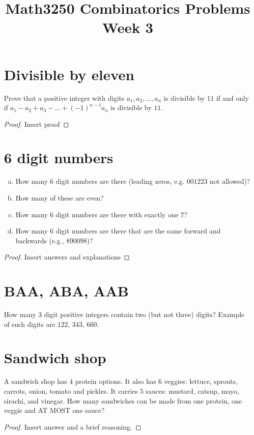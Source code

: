 \documentclass[12pt]{amsart}
\title{Math3250 Combinatorics Problems Week 3}
\date{}
\begin{document}
\maketitle





\section{Divisible by eleven}
Prove that a positive integer with digits $a_1, a_2, \dots, a_n$ is divisible by $11$ if and only if $a_1 - a_2 + a_3 - \dots + (-1)^{n-1} a_n$ is divisible by $11$.

\begin{proof}
Insert proof
\end{proof}



\section{6 digit numbers}
\begin{enumerate}[a)]
    \item  How many $6$ digit numbers are there (leading zeros, e.g. $001223$ not allowed)? 
    \item How many of these are even? 
    \item How many 6 digit numbers are there with exactly one 7? 
    \item How many 6 digit numbers are there that are the same forward and backwards (e.g., $890098$)?
\end{enumerate}

\begin{proof}
Insert answers and explanations
\end{proof}



\section{BAA, ABA, AAB}
How many 3 digit positive integers contain two (but not three) digits? Example of such digits are $122$, $343$, $660$.


\section{Sandwich shop} 
A sandwich shop has $4$ protein options. 
It also has $6$ veggies: lettuce, sprouts, carrots, onion, tomato and pickles. It carries $5$ sauces: mustard, catsup, mayo, sirachi, and vinegar. How many sandwiches can be made from one protein, one veggie and AT MOST one sauce?
\begin{proof}
Insert answer and a brief reasoning.
\end{proof}
\end{document}
